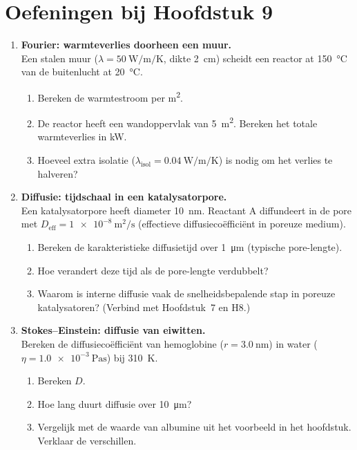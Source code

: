 
\section*{Oefeningen bij Hoofdstuk 9}

\begin{enumerate}

\item \textbf{Fourier: warmteverlies doorheen een muur.} \\
Een stalen muur ($\lambda = \SI{50}{\watt\per\metre\per\kelvin}$, dikte \SI{2}{\centi\metre}) scheidt een reactor at \SI{150}{\celsius} van de buitenlucht at \SI{20}{\celsius}.
\begin{enumerate}
\item[(a)] Bereken de warmtestroom per \si{\metre\squared}.
\item[(b)] De reactor heeft een wandoppervlak van \SI{5}{\metre\squared}. Bereken het totale warmteverlies in \si{\kilo\watt}.
\item[(c)] Hoeveel extra isolatie ($\lambda_{\text{isol}} = \SI{0.04}{\watt\per\metre\per\kelvin}$) is nodig om het verlies te halveren?
\end{enumerate}

\item \textbf{Diffusie: tijdschaal in een katalysatorpore.} \\
Een katalysatorpore heeft diameter \SI{10}{\nano\metre}. Reactant A diffundeert in de pore met $D_{\text{eff}} = \SI{1e-8}{\metre\squared\per\second}$ (effectieve diffusieco\"effici\"ent in poreuze medium).
\begin{enumerate}
\item[(a)] Bereken de karakteristieke diffusietijd over \SI{1}{\micro\metre} (typische pore-lengte).
\item[(b)] Hoe verandert deze tijd als de pore-lengte verdubbelt?
\item[(c)] Waarom is interne diffusie vaak de snelheidsbepalende stap in poreuze katalysatoren? (Verbind met Hoofdstuk~7 en H8.)
\end{enumerate}

\item \textbf{Stokes--Einstein: diffusie van eiwitten.} \\
Bereken de diffusieco\"effici\"ent van hemoglobine ($r = \SI{3.0}{\nano\metre}$) in water ($\eta = \SI{1.0e-3}{\pascal\second}$) bij \SI{310}{\kelvin}.
\begin{enumerate}
\item[(a)] Bereken $D$.
\item[(b)] Hoe lang duurt diffusie over \SI{10}{\micro\metre}?
\item[(c)] Vergelijk met de waarde van albumine uit het voorbeeld in het hoofdstuk. Verklaar de verschillen.
\end{enumerate}


\end{enumerate}
